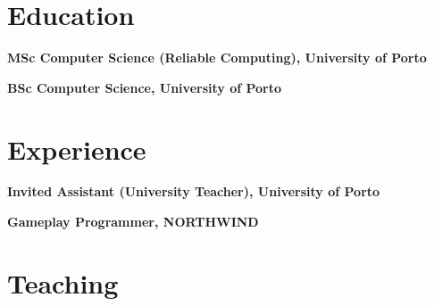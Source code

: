 \documentclass[11pt,a4paper]{moderncv}
\begin{document}
\makecvtitle%

\vspace*{-3em}%





\section{Education}

\begin{description}[labelwidth=60pt,align=right,leftmargin=!]
    \item[\normalfont{\emph{2019 -- 2023}}] \textbf{MSc Computer Science (Reliable Computing), University of Porto}
    \item[\normalfont{\emph{2016 -- 2019}}] \textbf{BSc Computer Science, University of Porto}
\end{description}


\section{Experience}

\begin{description}[labelwidth=60pt,align=right,leftmargin=!]
    \item[\normalfont{\emph{2023 -- curr}}] \textbf{Invited Assistant (University Teacher), University of Porto}
    \item[\normalfont{\emph{2021 -- 2022}}] \textbf{Gameplay Programmer, NORTHWIND}
\end{description}


\section{Teaching}
\end{document}
